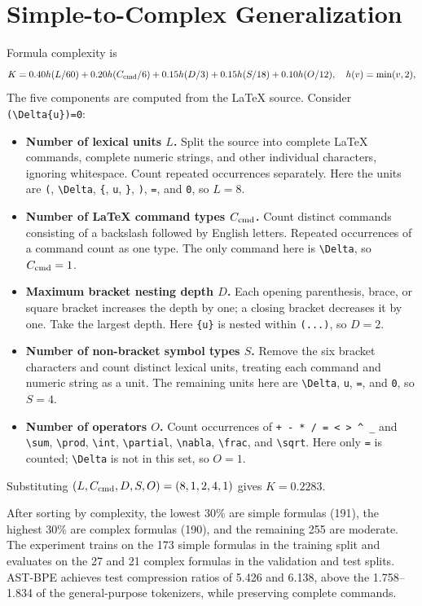 \documentclass[11pt,letterpaper]{article}
\begin{document}
\section{Simple-to-Complex Generalization}\label{app:generalization}
Formula complexity is
\begin{equation*}
 K=0.40h(L/60)+0.20h(C_{\rm cmd}/6)+0.15h(D/3)+0.15h(S/18)+0.10h(O/12),\quad h(v)=\min(v,2),
\end{equation*}
The five components are computed from the LaTeX source. Consider \verb|(\Delta{u})=0|:
\begin{itemize}\setlength{\itemsep}{3pt}\setlength{\parsep}{0pt}
\item \textbf{Number of lexical units $L$.} Split the source into complete LaTeX commands, complete numeric strings, and other individual characters, ignoring whitespace. Count repeated occurrences separately. Here the units are \verb|(|, \verb|\Delta|, \verb|{|, \verb|u|, \verb|}|, \verb|)|, \verb|=|, and \verb|0|, so $L=8$.
\item \textbf{Number of LaTeX command types $C_{\rm cmd}$.} Count distinct commands consisting of a backslash followed by English letters. Repeated occurrences of a command count as one type. The only command here is \verb|\Delta|, so $C_{\rm cmd}=1$.
\item \textbf{Maximum bracket nesting depth $D$.} Each opening parenthesis, brace, or square bracket increases the depth by one; a closing bracket decreases it by one. Take the largest depth. Here \verb|{u}| is nested within \verb|(...)|, so $D=2$.
\item \textbf{Number of non-bracket symbol types $S$.} Remove the six bracket characters and count distinct lexical units, treating each command and numeric string as a unit. The remaining units here are \verb|\Delta|, \verb|u|, \verb|=|, and \verb|0|, so $S=4$.
\item \textbf{Number of operators $O$.} Count occurrences of \verb|+ - * / = < > ^ _| and \verb|\sum|, \verb|\prod|, \verb|\int|, \verb|\partial|, \verb|\nabla|, \verb|\frac|, and \verb|\sqrt|. Here only \verb|=| is counted; \verb|\Delta| is not in this set, so $O=1$.
\end{itemize}
Substituting $(L,C_{\rm cmd},D,S,O)=(8,1,2,4,1)$ gives $K=0.2283$.

After sorting by complexity, the lowest 30\% are simple formulas (191), the highest 30\% are complex formulas (190), and the remaining 255 are moderate. The experiment trains on the 173 simple formulas in the training split and evaluates on the 27 and 21 complex formulas in the validation and test splits. AST-BPE achieves test compression ratios of 5.426 and 6.138, above the 1.758--1.834 of the general-purpose tokenizers, while preserving complete commands.
\begin{table}[H]
\caption{Training on simple formulas and testing on complex formulas; 21 test formulas. Metrics are the same as in Table~\ref{tab:upstream}.}\label{tab:generalization}
\centering\small
\end{table}
\end{document}
